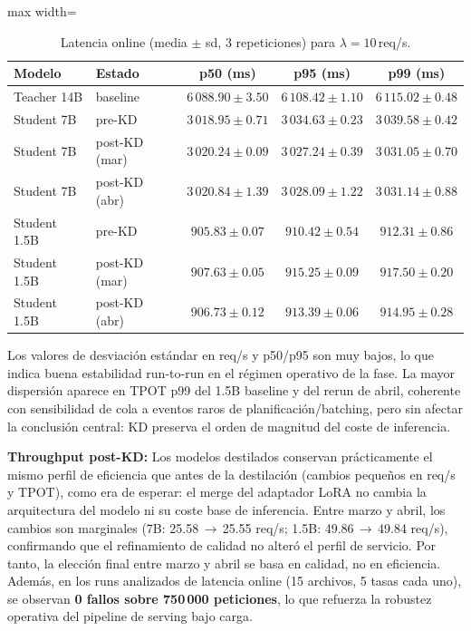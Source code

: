 \documentclass[11pt,a4paper]{article}
\begin{document}
\begin{table}[H]
\centering
\caption{Latencia online (media $\pm$ sd, 3 repeticiones) para
         $\lambda=10$\,req/s.}
\label{tab:online-latency}
\begin{adjustbox}{max width=\textwidth}
\begin{tabular}{llccc}
\toprule
\textbf{Modelo} & \textbf{Estado} & \textbf{p50 (ms)} & \textbf{p95 (ms)} & \textbf{p99 (ms)} \\
\midrule
Teacher 14B  & baseline & $6\,088.90 \pm 3.50$ & $6\,108.42 \pm 1.10$ & $6\,115.02 \pm 0.48$ \\
\midrule
Student 7B   & pre-KD        & $3\,018.95 \pm 0.71$ & $3\,034.63 \pm 0.23$ & $3\,039.58 \pm 0.42$ \\
Student 7B   & post-KD (mar) & $3\,020.24 \pm 0.09$ & $3\,027.24 \pm 0.39$ & $3\,031.05 \pm 0.70$ \\
Student 7B   & post-KD (abr) & $3\,020.84 \pm 1.39$ & $3\,028.09 \pm 1.22$ & $3\,031.14 \pm 0.88$ \\
\midrule
Student 1.5B & pre-KD        & $905.83 \pm 0.07$ & $910.42 \pm 0.54$ & $912.31 \pm 0.86$ \\
Student 1.5B & post-KD (mar) & $907.63 \pm 0.05$ & $915.25 \pm 0.09$ & $917.50 \pm 0.20$ \\
Student 1.5B & post-KD (abr) & $906.73 \pm 0.12$ & $913.39 \pm 0.06$ & $914.95 \pm 0.28$ \\
\bottomrule
\end{tabular}
\end{adjustbox}
\end{table}

Los valores de desviaci\'on est\'andar en req/s y p50/p95 son muy bajos,
lo que indica buena estabilidad run-to-run en el r\'egimen operativo de
la fase. La mayor dispersi\'on aparece en TPOT p99 del 1.5B baseline y
del rerun de abril, coherente con sensibilidad de cola a eventos raros
de planificaci\'on/batching, pero sin afectar la conclusi\'on central:
KD preserva el orden de magnitud del coste de inferencia.

\begin{infobox}
\small
\textbf{Throughput post-KD:} Los modelos destilados conservan pr\'acticamente
el mismo perfil de eficiencia que antes de la destilaci\'on (cambios
peque\~nos en req/s y TPOT), como era de esperar: el merge del adaptador
LoRA no cambia la arquitectura del modelo ni su coste base de inferencia.
Entre marzo y abril, los cambios son marginales (7B: 25.58\,$\to$\,25.55 req/s;
1.5B: 49.86\,$\to$\,49.84 req/s), confirmando que el refinamiento de calidad
no alter\'o el perfil de servicio. Por tanto, la elecci\'on final entre
marzo y abril se basa en calidad, no en eficiencia. Adem\'as, en los runs
analizados de latencia online (15 archivos, 5 tasas cada uno), se
observan \textbf{0 fallos sobre 750\,000 peticiones}, lo que refuerza la
robustez operativa del pipeline de serving bajo carga.
\end{infobox}
\end{document}
